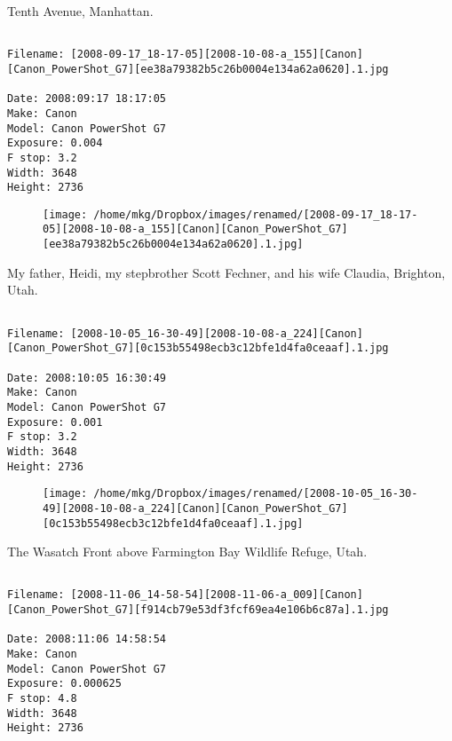 \clearpage
\onecolumn
\noindent Tenth Avenue, Manhattan.
\noindent
\begin{lstlisting}

Filename: [2008-09-17_18-17-05][2008-10-08-a_155][Canon][Canon_PowerShot_G7][ee38a79382b5c26b0004e134a62a0620].1.jpg

Date: 2008:09:17 18:17:05
Make: Canon
Model: Canon PowerShot G7
Exposure: 0.004
F stop: 3.2
Width: 3648
Height: 2736
\end{lstlisting}
\clearpage

\begin{figure}
\texttt{[image: /home/mkg/Dropbox/images/renamed/[2008-09-17\_18-17-05][2008-10-08-a\_155][Canon][Canon\_PowerShot\_G7][ee38a79382b5c26b0004e134a62a0620].1.jpg]}
\end{figure}
    
\clearpage
\onecolumn
\noindent My father, Heidi, my stepbrother Scott Fechner, and his wife Claudia, Brighton, Utah.
\noindent
\begin{lstlisting}

Filename: [2008-10-05_16-30-49][2008-10-08-a_224][Canon][Canon_PowerShot_G7][0c153b55498ecb3c12bfe1d4fa0ceaaf].1.jpg

Date: 2008:10:05 16:30:49
Make: Canon
Model: Canon PowerShot G7
Exposure: 0.001
F stop: 3.2
Width: 3648
Height: 2736
\end{lstlisting}
\clearpage

\begin{figure}
\texttt{[image: /home/mkg/Dropbox/images/renamed/[2008-10-05\_16-30-49][2008-10-08-a\_224][Canon][Canon\_PowerShot\_G7][0c153b55498ecb3c12bfe1d4fa0ceaaf].1.jpg]}
\end{figure}
    
\clearpage
\onecolumn
\noindent The Wasatch Front above Farmington Bay Wildlife Refuge, Utah.
\noindent
\begin{lstlisting}

Filename: [2008-11-06_14-58-54][2008-11-06-a_009][Canon][Canon_PowerShot_G7][f914cb79e53df3fcf69ea4e106b6c87a].1.jpg

Date: 2008:11:06 14:58:54
Make: Canon
Model: Canon PowerShot G7
Exposure: 0.000625
F stop: 4.8
Width: 3648
Height: 2736
\end{lstlisting}
\clearpage


